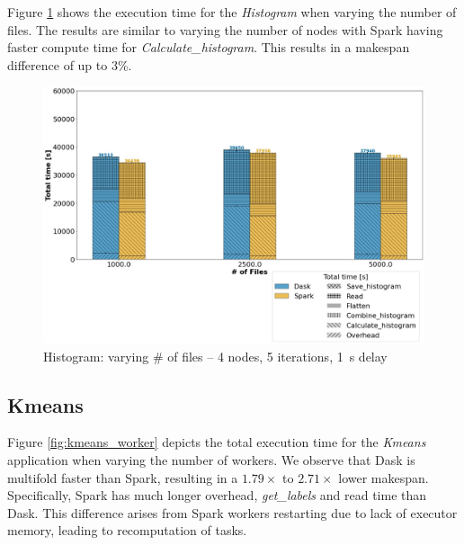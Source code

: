 \documentclass[conference]{IEEEtran}
\begin{document}
Figure \ref{fig:histogram_block} shows the execution time for the \textit{Histogram} when varying the number of files.
The results are similar to varying the number of nodes with Spark having faster compute time for \textit{Calculate\_histogram}.
This results in a makespan difference of up to 3\%.
\begin{figure}[!t]
	\centering
	\includegraphics[clip,width=\columnwidth]{figures/stacked_histogram_block.jpg}
	\caption{Histogram: varying \# of files -- 4 nodes, 5 iterations, \SI{1}{\second} delay}
	\label{fig:histogram_block}
\end{figure}

\subsection{Kmeans}
Figure \ref{fig:kmeans_worker} depicts the total execution time for the \textit{Kmeans} application when varying the number of workers.
We observe that Dask is multifold faster than Spark, resulting in a $1.79\times$ to $2.71\times$ lower makespan.
Specifically, Spark has much longer overhead, \textit{get\_labels} and read time than Dask.
This difference arises from Spark workers restarting due to lack of executor memory, leading to recomputation of tasks.
\end{document}
